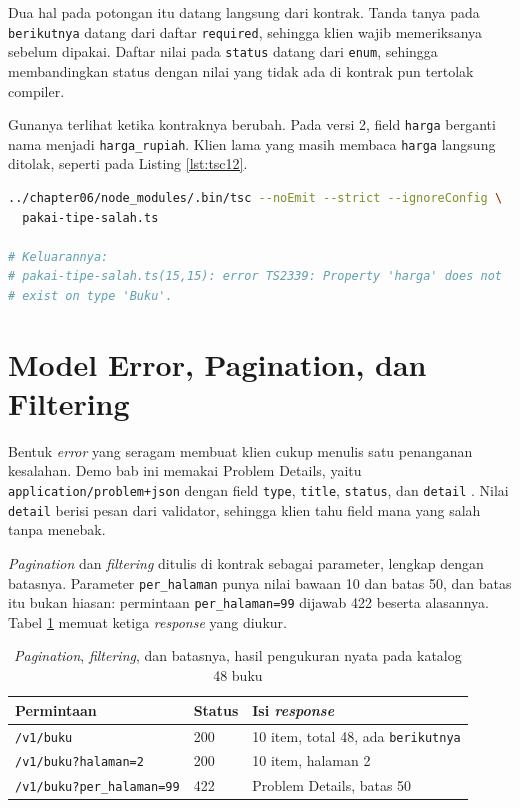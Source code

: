 Dua hal pada potongan itu datang langsung dari kontrak. Tanda tanya pada
\texttt{berikutnya} datang dari daftar \texttt{required}, sehingga klien wajib
memeriksanya sebelum dipakai. Daftar nilai pada \texttt{status} datang dari
\texttt{enum}, sehingga membandingkan status dengan nilai yang tidak ada di
kontrak pun tertolak compiler.

Gunanya terlihat ketika kontraknya berubah. Pada versi 2, field
\texttt{harga} berganti nama menjadi \texttt{harga\_rupiah}. Klien lama yang
masih membaca \texttt{harga} langsung ditolak, seperti pada Listing
\ref{lst:tsc12}.

\begin{lstlisting}[language=bash, caption={Kesalahan yang tertangkap sebelum program jalan, memakai \berkas{sources/chapter12/pakai-tipe-salah.ts}}, label={lst:tsc12}]
../chapter06/node_modules/.bin/tsc --noEmit --strict --ignoreConfig \
  pakai-tipe-salah.ts

# Keluarannya:
# pakai-tipe-salah.ts(15,15): error TS2339: Property 'harga' does not
# exist on type 'Buku'.
\end{lstlisting}

\section{Model Error, Pagination, dan Filtering}

Bentuk \textit{error} yang seragam membuat klien cukup menulis satu
penanganan kesalahan. Demo bab ini memakai Problem Details, yaitu
\texttt{application/problem+json} dengan field \texttt{type},
\texttt{title}, \texttt{status}, dan \texttt{detail} \cite{rfc9457}. Nilai
\texttt{detail} berisi pesan dari validator, sehingga klien tahu field mana
yang salah tanpa menebak.

\textit{Pagination} dan \textit{filtering} ditulis di kontrak sebagai
parameter, lengkap dengan batasnya. Parameter \texttt{per\_halaman} punya
nilai bawaan 10 dan batas 50, dan batas itu bukan hiasan: permintaan
\texttt{per\_halaman=99} dijawab 422 beserta alasannya. Tabel
\ref{tab:paging} memuat ketiga \textit{response} yang diukur.

\begin{table}[!htb]
  \centering
  \caption{\textit{Pagination}, \textit{filtering}, dan batasnya, hasil
           pengukuran nyata pada katalog 48 buku}
  \label{tab:paging}
  \begin{tabularx}{\textwidth}{Xll}
    \hline
    \textbf{Permintaan} & \textbf{Status} & \textbf{Isi \textit{response}} \\
    \hline
    \texttt{/v1/buku} & 200 & 10 item, total 48, ada \texttt{berikutnya} \\
    \hline
    \texttt{/v1/buku?halaman=2} & 200 & 10 item, halaman 2 \\
    \hline
    \texttt{/v1/buku?per\_halaman=99} & 422 & Problem Details, batas 50 \\
    \hline
  \end{tabularx}
\end{table}

